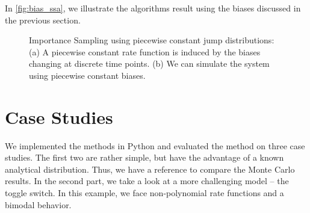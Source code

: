 In \autoref{fig:bias_ssa}, we illustrate the algorithms result using
the biases discussed in the previous section.
\begin{figure}
  \centering
  \caption[Piecewise constant jump distributions \& biased
  SSA]{Importance Sampling using piecewise constant jump
    distributions: (a) A piecewise constant rate function is induced by
    the biases changing at discrete time points. (b) We can simulate
  the system using piecewise constant biases.}
\end{figure}


\section{Case Studies}
We implemented the methods in Python and evaluated the method on
three case studies.
The first two are rather simple, but have the advantage of a known
analytical distribution.
Thus, we have a reference to compare the Monte Carlo results.
In the second part, we take a look at a more challenging model -- the
toggle switch.
In this example, we face non-polynomial rate functions and a bimodal behavior.
